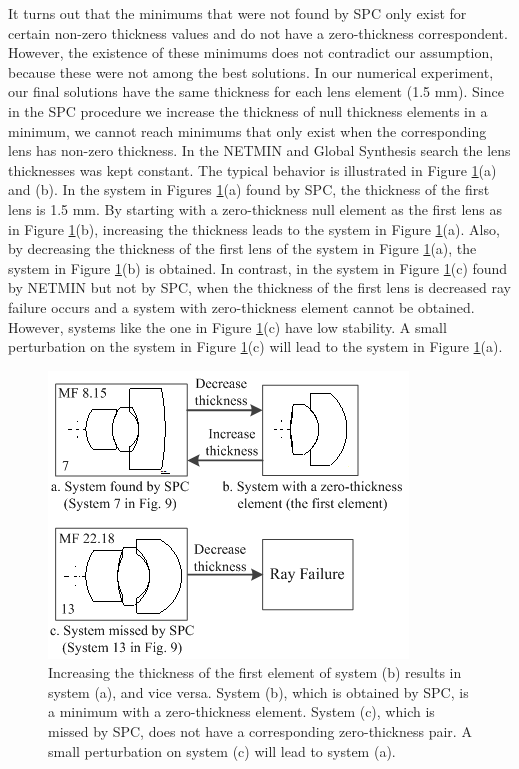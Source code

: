It turns out that the minimums that were not found by SPC only exist for certain non-zero thickness values and do not have a zero-thickness correspondent. However, the existence of these minimums does not contradict our assumption, because these were not among the best solutions. In our numerical experiment, our final solutions have the same thickness for each lens element (1.5 mm). Since in the SPC procedure we increase the thickness of null thickness elements in a minimum, we cannot reach minimums that only exist when the corresponding lens has non-zero thickness. In the NETMIN and Global Synthesis search the lens thicknesses was kept constant. The typical behavior is illustrated in Figure \ref{fig:thicknesschange}(a) and (b). In the system in Figures \ref{fig:thicknesschange}(a) found by SPC, the thickness of the first lens is 1.5 mm. By starting with a zero-thickness null element as the first lens as in Figure \ref{fig:thicknesschange}(b), increasing the thickness leads to the system in Figure \ref{fig:thicknesschange}(a). Also, by decreasing the thickness of the first lens of the system in Figure \ref{fig:thicknesschange}(a), the system in Figure \ref{fig:thicknesschange}(b) is obtained. In contrast, in the system in Figure \ref{fig:thicknesschange}(c) found by NETMIN but not by SPC, when the thickness of the first lens is decreased ray failure occurs and a system with zero-thickness element cannot be obtained. However, systems like the one in Figure \ref{fig:thicknesschange}(c) have low stability. A small perturbation on the system in Figure \ref{fig:thicknesschange}(c) will lead to the system in Figure \ref{fig:thicknesschange}(a).

\begin{figure}[h!]
    \centering
    \includegraphics[scale=0.7]{chapter-3/figures/thicknesschange.png}
    \caption{Increasing the thickness of the first element of system (b) results in system (a), and vice versa. System (b), which is obtained by SPC, is a minimum with a zero-thickness element. System (c), which is missed by SPC, does not have a corresponding zero-thickness pair. A small perturbation on system (c) will lead to system (a).}
    \label{fig:thicknesschange}
\end{figure}


